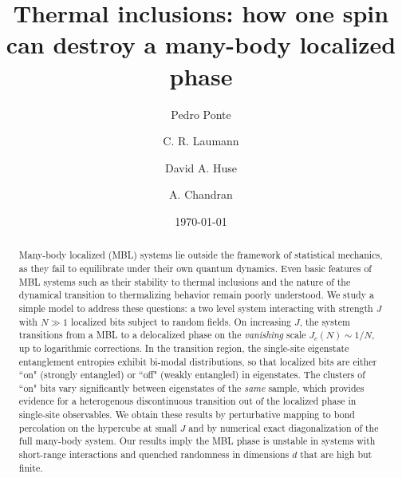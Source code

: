 \documentclass[aps,pra,twocolumn,a4paper,showpacs,superscriptaddress,floatfix,10pt]{revtex4}
\begin{document}
\title{Thermal inclusions: how one spin can destroy a many-body localized phase}

\author{Pedro Ponte}

\author{C. R. Laumann}


\author{David A. Huse}


\author{A. Chandran}



\date{\today}


\begin{abstract}

Many-body localized (MBL) systems lie outside the framework of statistical mechanics, as they fail to equilibrate under their own quantum dynamics.
Even basic features of MBL systems such as their stability to thermal inclusions and the nature of the dynamical transition to thermalizing behavior remain poorly understood.
We study a simple model to address these questions: a two level system interacting with strength $J$ with $N\gg 1$ localized bits subject to random fields.
On increasing $J$, the system transitions from a MBL to a delocalized phase on the \emph{vanishing} scale $J_c(N) \sim 1/N$, up to logarithmic corrections.
In the transition region, the single-site eigenstate entanglement entropies exhibit bi-modal distributions, so that localized bits are either ``on" (strongly entangled) or ``off" (weakly entangled) in eigenstates.
The clusters of ``on" bits vary significantly between eigenstates of the \emph{same} sample, which provides evidence for a heterogenous discontinuous transition out of the localized phase in single-site observables.
We obtain these results by perturbative mapping to bond percolation on the hypercube at small $J$ and by numerical exact diagonalization of the full many-body system.
Our results imply the MBL phase is unstable in systems with short-range interactions and quenched randomness in dimensions $d$ that are high but finite.

\end{abstract}

\maketitle
\end{document}
